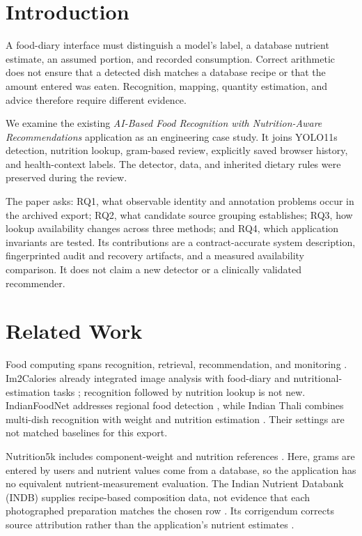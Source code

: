 \documentclass[conference]{IEEEtran}
\begin{document}
\section{Introduction}
A food-diary interface must distinguish a model's label, a database nutrient estimate, an assumed portion, and recorded consumption. Correct arithmetic does not ensure that a detected dish matches a database recipe or that the amount entered was eaten. Recognition, mapping, quantity estimation, and advice therefore require different evidence.

We examine the existing \emph{AI-Based Food Recognition with Nutrition-Aware Recommendations} application as an engineering case study. It joins YOLO11s detection, nutrition lookup, gram-based review, explicitly saved browser history, and health-context labels. The detector, data, and inherited dietary rules were preserved during the review.

The paper asks: RQ1, what observable identity and annotation problems occur in the archived export; RQ2, what candidate source grouping establishes; RQ3, how lookup availability changes across three methods; and RQ4, which application invariants are tested. Its contributions are a contract-accurate system description, fingerprinted audit and recovery artifacts, and a measured availability comparison. It does not claim a new detector or a clinically validated recommender.

\section{Related Work}
Food computing spans recognition, retrieval, recommendation, and monitoring \cite{min2019food}. Im2Calories already integrated image analysis with food-diary and nutritional-estimation tasks \cite{meyers2015im2calories}; recognition followed by nutrition lookup is not new. IndianFoodNet addresses regional food detection \cite{indianfoodnet_2023}, while Indian Thali combines multi-dish recognition with weight and nutrition estimation \cite{indian_thali_2025}. Their settings are not matched baselines for this export.

Nutrition5k includes component-weight and nutrition references \cite{thames2021nutrition5k}. Here, grams are entered by users and nutrient values come from a database, so the application has no equivalent nutrient-measurement evaluation. The Indian Nutrient Databank (INDB) supplies recipe-based composition data, not evidence that each photographed preparation matches the chosen row \cite{development_indb_2024}. Its corrigendum corrects source attribution rather than the application's nutrient estimates \cite{indb_corrigendum_2025}.
\end{document}
